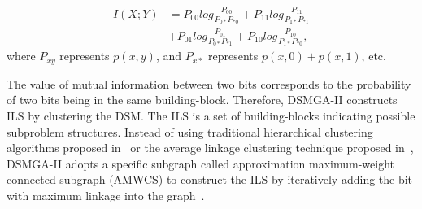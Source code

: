 \documentclass{sig-alternate-05-2015}
\begin{document}
\begin{equation} 
\begin{split}
I(X;Y) &= P_{00 }log\frac{P_{00}}{P_{0*} P_{*0}} + P_{11 }log\frac{P_{11}}{P_{1*} P_{*1}}  \\
	    &+ P_{01 }log\frac{P_{01}}{P_{0*} P_{*1}} + P_{10 }log\frac{P_{10}}{P_{1*} P_{*0}},  
\end{split}
\end{equation}
where $P_{xy}$ represents $p(x,y)$, and $P_{x*}$ represents $p(x,0)+p(x,1)$, etc.

The value of mutual information between two bits corresponds to the probability of two bits being in the same building-block.
Therefore, DSMGA-II constructs ILS by clustering the DSM.
The ILS is a set of building-blocks indicating possible subproblem structures.
Instead of using traditional hierarchical clustering algorithms proposed in~\cite{thierens:LTGA} or the average linkage clustering technique proposed in~\cite{thierens:OM}, DSMGA-II adopts a specific subgraph called approximation maximum-weight connected subgraph (AMWCS) to construct the ILS by iteratively adding the bit with maximum linkage into the graph~\cite{hsu:DSMGA2}.


\end{document}
